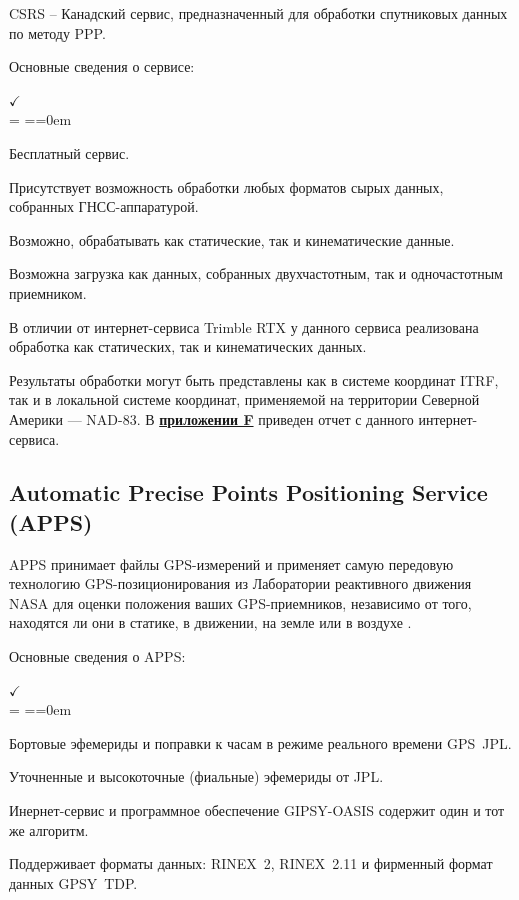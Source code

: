 CSRS – Канадский сервис, предназначенный для обработки спутниковых данных по методу PPP.
 
Основные сведения о сервисе: 
 
\begin{list}{$ \checkmark $\\[6pt]} {\parsep = \parskip \itemsep=\parsep \topsep=0em}
	\item Бесплатный сервис. 
	\item Присутствует возможность обработки любых форматов сырых данных, собранных ГНСС-аппаратурой.
	\item Возможно, обрабатывать как статические, так и кинематические данные.
	\item Возможна загрузка как данных, собранных двухчастотным, так и одночастотным приемником.
\end{list}

В отличии от интернет-сервиса Trimble RTX у данного сервиса реализована обработка как статических, так и кинематических данных. 

Результаты обработки могут быть представлены как в системе координат ITRF, так и в локальной системе координат, применяемой на территории Северной Америки --- NAD-83. В \textbf{\underline{приложении F}} приведен отчет с данного интернет-сервиса.


\subsection{Automatic Precise Points Positioning Service (APPS)}\label{subsec:ch2/sec1/sub4}

APPS принимает файлы GPS-измерений и применяет самую передовую технологию GPS-позиционирования из Лаборатории реактивного движения NASA для оценки положения ваших GPS-приемников, независимо от того, находятся ли они в статике, в движении, на земле или в воздухе \cite{src80}.

Основные сведения о APPS:

\begin{list}{$ \checkmark $\\[6pt]} {\parsep = \parskip \itemsep=\parsep \topsep=0em}
	\item Бортовые эфемериды и поправки к часам в режиме реального времени GPS~JPL. 
	\item Уточненные и высокоточные (фиальные) эфемериды от JPL.
	\item Инернет-сервис и программное обеспечение  GIPSY-OASIS содержит один и тот же алгоритм.
	\item Поддерживает форматы данных: RINEX~2, RINEX~2.11 и фирменный формат данных GPSY~TDP.
\end{list}

